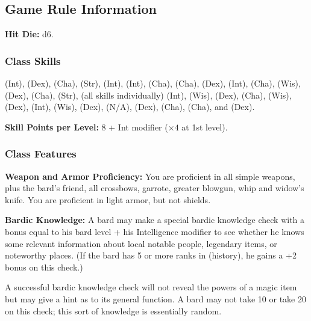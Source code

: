\subsection{Game Rule Information}

\textbf{Hit Die:} d6.

\subsubsection{Class Skills}
 (Int),  (Dex),  (Cha),  (Str),  (Int),  (Int),  (Cha),  (Cha),  (Dex),  (Int),  (Cha),  (Wis),  (Dex),  (Cha),  (Str),  (all skills individually) (Int),  (Wis),  (Dex),  (Cha),  (Wis),  (Dex),  (Int),  (Wis),  (Dex),  (N/A),  (Dex),  (Cha),  (Cha), and  (Dex).

\textbf{Skill Points per Level:} 8 + Int modifier ($\times4$ at 1st level).

\subsubsection{Class Features}

\textbf{Weapon and Armor Proficiency:} You are proficient in all simple weapons, plus the bard's friend, all crossbows, garrote, greater blowgun, whip and widow's knife. You are proficient in light armor, but not shields.

\textbf{Bardic Knowledge:} A bard may make a special bardic knowledge check with a bonus equal to his bard level + his Intelligence modifier to see whether he knows some relevant information about local notable people, legendary items, or noteworthy places. (If the bard has 5 or more ranks in  (history), he gains a +2 bonus on this check.)

A successful bardic knowledge check will not reveal the powers of a magic item but may give a hint as to its general function. A bard may not take 10 or take 20 on this check; this sort of knowledge is essentially random.




